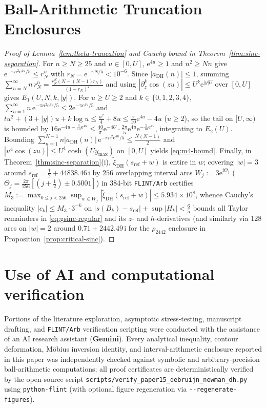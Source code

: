 \documentclass[11pt,a4paper,reqno]{amsart}
\theoremstyle{definition}
\theoremstyle{remark}
\numberwithin{equation}{section}
\newcommand{\ii}{\mathrm{i}}
\newcommand{\ee}{\mathrm{e}}
\begin{document}
\section{Ball-Arithmetic Truncation Enclosures}
\label{app:truncation-bounds}

\begin{proof}[Proof of Lemma~\ref{lem:theta-truncation} and Cauchy bound in Theorem~\ref{thm:sinc-separation}]
For $n \ge N \ge 25$ and $u \in [0, U]$, $\ee^{4u} \ge 1$ and $n^2 \ge Nn$ give $\ee^{-\pi n^2\ee^{4u}/5} \le r_N^n$ with $r_N = \ee^{-\pi N/5} < 10^{-6}$. Since $|a_{\mathrm{DH}}(n)| \le 1$, summing $\sum_{n=N}^{\infty} n\,r_N^n = \frac{r_N^N(N - (N-1)r_N)}{(1 - r_N)^2}$ and using $|\partial_z^k\cos(zu)| \le U^k\ee^{|y|U}$ over $[0, U]$ gives $E_1(U,N,k,|y|)$. For $u \ge U \ge 2$ and $k \in \{0,1,2,3,4\}$, $\sum_{n=1}^{\infty} n\,\ee^{-\pi n^2\ee^{4u}/5} \le 2\ee^{-\pi\ee^{4u}/5}$ and $t u^2 + (3 + |y|)u + k\log u \le \frac{u^2}{4} + 8u \le \frac{\pi}{10}\ee^{4u} - 4u$ ($u \ge 2$), so the tail on $[U,\infty)$ is bounded by $16\ee^{-4u - \frac{\pi}{10}\ee^{4u}} \le \frac{40}{\pi}\ee^{-4U}\cdot \frac{2\pi}{5}\ee^{4u}\ee^{-\frac{\pi}{10}\ee^{4u}}$, integrating to $E_2(U)$. Bounding $\sum_{n=1}^{N-1} n|a_{\mathrm{DH}}(n)|\,\ee^{-\pi n^2\ee^{4u}/5} \le \frac{N(N-1)}{2}$ and $|u^4\cos(zu)| \le U^4\cosh(U y_{\max})$ on $[0,U]$ yields \eqref{eq:m4-bound}. Finally, in Theorem~\ref{thm:sinc-separation}(i), $\tilde{\xi}_{\mathrm{DH}}(s_{\mathrm{ref}} + w)$ is entire in $w$; covering $|w| = 3$ around $s_{\mathrm{ref}} = \frac{1}{2} + 44838.46\,\ii$ by $256$ overlapping interval arcs $W_j := 3\ee^{\ii\Theta_j}$ ($\Theta_j = \frac{2\pi}{256}[(j + \frac{1}{2}) \pm 0.5001]$) in 384-bit \texttt{FLINT/Arb} certifies $M_3 := \max_{0 \le j < 256}\sup_{w \in W_j}|\tilde{\xi}_{\mathrm{DH}}(s_{\mathrm{ref}} + w)| \le 5.934 \times 10^8$, whence Cauchy's inequality $|c_k| \le M_3\cdot 3^{-k}$ on $|s(B_k) - s_{\mathrm{ref}}| + \sup|H_k| < \frac{6}{5}$ bounds all Taylor remainders in \eqref{eq:gsinc-regular} and its $z$- and $h$-derivatives (and similarly via $128$ arcs on $|w| = 2$ around $0.71 + 2442.49\,\ii$ for the $\rho_{2442}$ enclosure in Proposition~\ref{prop:critical-sinc}).
\end{proof}

\section*{Use of AI and computational verification}

Portions of the literature exploration, asymptotic stress-testing, manuscript drafting, and \texttt{FLINT/Arb} verification scripting were conducted with the assistance of an AI research assistant (\textbf{Gemini}). Every analytical inequality, contour deformation, M\"obius inversion identity, and interval-arithmetic enclosure reported in this paper was independently checked against symbolic and arbitrary-precision ball-arithmetic computations; all proof certificates are deterministically verified by the open-source script \nolinkurl{scripts/verify_paper15_debruijn_newman_dh.py} using \texttt{python-flint} \cite{johansson2017} (with optional figure regeneration via \texttt{-{}-regenerate-figures}).
\end{document}
